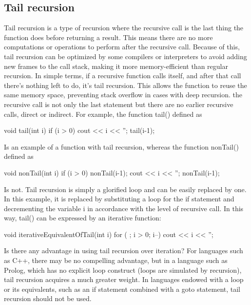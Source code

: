 \documentclass{report}
\begin{document}
    \subsection{Tail recursion}
    \bigbreak \noindent 
    Tail recursion is a type of recursion where the recursive call is the last thing the function does before returning a result. This means there are no more computations or operations to perform after the recursive call.
    \bigbreak \noindent 
    Because of this, tail recursion can be optimized by some compilers or interpreters to avoid adding new frames to the call stack, making it more memory-efficient than regular recursion.
    \bigbreak \noindent 
    In simple terms, if a recursive function calls itself, and after that call there’s nothing left to do, it's tail recursion. This allows the function to reuse the same memory space, preventing stack overflow in cases with deep recursion.
    \bigbreak \noindent 
    the recursive call is not only the last statement but there are no earlier recursive calls, direct or indirect. For example, the function tail() defined as
    \bigbreak \noindent 
    \begin{cppcode}
        void tail(int i) {
            if (i > 0) {
                cout << i << '';
                tail(i-1);
            }
        }
    \end{cppcode}
    \bigbreak \noindent 
    Is an example of a function with tail recursion, whereas the function nonTail() defined as
    \bigbreak \noindent 
    \begin{cppcode}
        void nonTail(int i) {
            if (i > 0) {
                nonTail(i-1);
                cout << i << '';
                nonTail(i-1);
            }
        }
    \end{cppcode}
    \bigbreak \noindent 
    Is not. Tail recursion is simply a glorified loop and can be easily replaced by one. In this example, it is replaced by substituting a loop for the if statement and decrementing the variable i in accordance with the level of recursive call. In this way, tail() can be expressed by an iterative function:
    \bigbreak \noindent 
    \begin{cppcode}
        void iterativeEquivalentOfTail(int i) {
            for ( ; i > 0; i--)
            cout << i << '';
        }
    \end{cppcode}
    \bigbreak \noindent 
    Is there any advantage in using tail recursion over iteration? For languages such as C++, there may be no compelling advantage, but in a language such as Prolog, which has no explicit loop construct (loops are simulated by recursion), tail recursion acquires a much greater weight. In languages endowed with a loop or its equivalents, such as an if statement combined with a goto statement, tail recursion should not be used.
\end{document}
